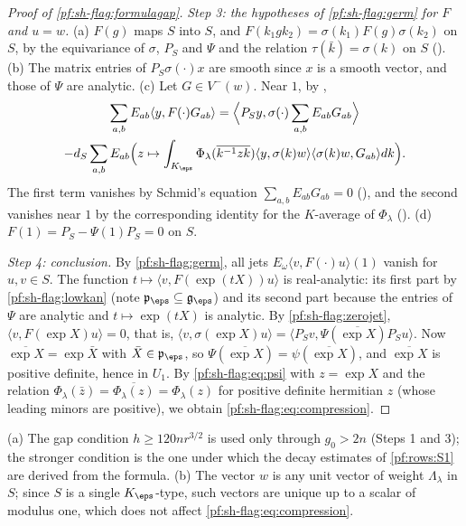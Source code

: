 \begin{proof}[Proof of \cref{pf:sh-flag:formulagap}]
\emph{Step 3: the hypotheses of \cref{pf:sh-flag:germ} for $F$ and $u=w$.} (a) $F(g)$ maps $S$ into $S$, and
$F(k_1gk_2)=\sigma(k_1)F(g)\sigma(k_2)$ on $S$, by the equivariance of $\sigma$, $P_S$ and $\Psi$ and the relation
$\tau(\bar k)=\sigma(k)$ on $S$ (). (b) The matrix entries of
$P_S\sigma(\cdot)x$ are smooth since $x$ is a smooth vector, and those of $\Psi$ are analytic. (c) Let $G\in V^-(w)$. Near
$1$, by ,
\begin{multline*}
\sum_{a,b}E_{ab}\langle y,F(\cdot)G_{ab}\rangle=\Bigl\langle P_Sy,\sigma(\cdot)\sum_{a,b}E_{ab}G_{ab}\Bigr\rangle\\
-d_S\sum_{a,b}E_{ab}\Bigl(z\mapsto\int_{K_\eps}\Phi_\lambda(\overline{k^{-1}zk})\langle y,\sigma(k)w\rangle\langle\sigma(k)w,
G_{ab}\rangle dk\Bigr).
\end{multline*}
The first term vanishes by Schmid's equation $\sum_{a,b}E_{ab}G_{ab}=0$ (),
and the second vanishes near $1$ by the corresponding identity for the $K$-average of $\Phi_\lambda$
(). (d) $F(1)=P_S-\Psi(1)P_S=0$ on $S$.

\emph{Step 4: conclusion.} By \cref{pf:sh-flag:germ}, all jets $E_\omega\langle v,F(\cdot)u\rangle(1)$ vanish for $u,v\in S$.
The function $t\mapsto\langle v,F(\exp(tX))u\rangle$ is real-analytic: its first part by \cref{pf:sh-flag:lowkan} (note
$\mathfrak p_\eps\subseteq\mathfrak g_\eps$) and its second part because the entries of $\Psi$ are analytic and $t\mapsto\exp(tX)$ is
analytic. By \cref{pf:sh-flag:zerojet}, $\langle v,F(\exp X)u\rangle=0$, that is,
$\langle v,\sigma(\exp X)u\rangle=\langle P_Sv,\Psi(\overline{\exp X})P_Su\rangle$. Now $\overline{\exp X}=\exp\bar X$ with
$\bar X\in\mathfrak p_\eps$, so $\Psi(\overline{\exp X})=\psi(\overline{\exp X})$, and $\overline{\exp X}$ is positive definite, hence
in $U_1$. By \eqref{pf:sh-flag:eq:psi} with $z=\exp X$ and the relation
$\Phi_\lambda(\bar z)=\overline{\Phi_\lambda(z)}=\Phi_\lambda(z)$ for positive definite hermitian $z$ (whose leading minors are
positive), we obtain \eqref{pf:sh-flag:eq:compression}.
\end{proof}

\begin{remark}\label{pf:sh-flag:rem:formulagap}
(a) The gap condition $h\ge120nr^{3/2}$ is used only through $g_0>2n$ (Steps 1 and 3); the stronger condition is the one
under which the decay estimates of \ref{pf:rows:S1} are derived from the formula. (b) The vector $w$ is any unit vector
of weight $\Lambda_\lambda$ in $S$; since $S$ is a single $K_\eps$-type, such vectors are unique up to a scalar of modulus one,
which does not affect \eqref{pf:sh-flag:eq:compression}.
\end{remark}

